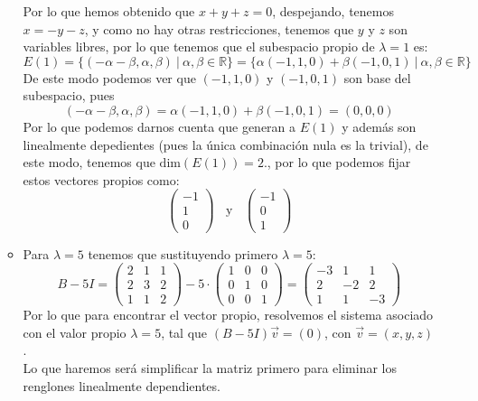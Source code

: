 \begin{itemize}
\begin{itemize}
    Por lo que hemos obtenido que $x+y+z=0$, despejando, tenemos $x=-y-z$, y como no hay otras restricciones, tenemos que $y$ y $z$ son variables libres, por lo que tenemos que el subespacio propio de $\lambda=1$ es:
    \[E(1)=\{(-\alpha-\beta,\alpha, \beta)~|~\alpha,\beta\in\mathbb{R}\}=\{\alpha(-1,1,0)+\beta(-1,0,1)~|~\alpha,\beta\in\mathbb{R}\}\]
    De este modo podemos ver que $(-1,1,0)$ y $(-1,0,1)$ son base del subespacio, pues
    \[(-\alpha-\beta,\alpha, \beta)=\alpha(-1,1,0)+\beta(-1,0,1)=(0,0,0)\]
    Por lo que podemos darnos cuenta que generan a $E(1)$ y adem\'as son linealmente depedientes (pues la \'unica combinaci\'on nula es la trivial), de este modo, tenemos que $\text{dim}(E(1))=2$., por lo que podemos fijar estos vectores propios como: $$\begin{pmatrix}-1\\ 1\\ 0\end{pmatrix}~~~~\text{y}~~~~\begin{pmatrix}-1\\ 0\\ 1\end{pmatrix}$$
    
    \item Para $\lambda=5$ tenemos que sustituyendo primero $\lambda=5$:
    $$B-5I=\begin{pmatrix}2&1&1\\ 2&3&2\\ 1&1&2\end{pmatrix}-5\cdot \begin{pmatrix}1&0&0\\ 0&1&0\\ 0&0&1\end{pmatrix}=\begin{pmatrix}-3&1&1\\ 2&-2&2\\ 1&1&-3\end{pmatrix}$$
    Por lo que para encontrar el vector propio, resolvemos el sistema asociado con el valor propio $\lambda=5$, tal que $(B-5I)\vec{v}=(0)$, con $\vec{v}=(x,y,z)$.\\
    Lo que haremos ser\'a simplificar la matriz primero para eliminar los renglones linealmente dependientes.\\
    

\end{itemize}
\end{itemize}
